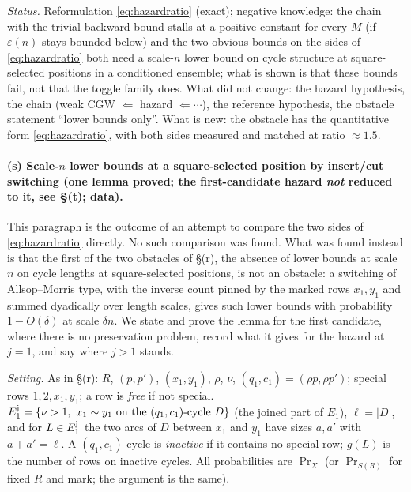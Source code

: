 \emph{Status.}  Reformulation \eqref{eq:hazardratio} (exact);
negative knowledge: the chain with the trivial backward bound stalls
at a positive constant for every $M$ (if $\varepsilon(n)$ stays
bounded below) and the two obvious bounds on the sides of
\eqref{eq:hazardratio} both need a scale-$n$ lower bound on cycle
structure at square-selected positions in a conditioned ensemble;
what is shown is that these bounds fail, not that the toggle family
does.  What did
not change: the hazard hypothesis, the chain (weak CGW $\Leftarrow$
hazard $\Leftarrow\cdots$), the reference hypothesis, the obstacle
statement ``lower bounds only''.  What is new: the obstacle has the
quantitative form \eqref{eq:hazardratio}, with both sides measured
and matched at ratio $\approx1.5$.

\paragraph{(s) Scale-$n$ lower bounds at a square-selected position by
insert/cut switching (one lemma proved; the first-candidate hazard
\emph{not} reduced to it, see \S(t); data).}
This paragraph is the outcome of an attempt to compare the two sides of
\eqref{eq:hazardratio} directly.  No such comparison was found.  What
was found instead is that the first of the two obstacles of \S(r), the
absence of lower bounds at scale $n$ on cycle lengths at
square-selected positions, is not an obstacle: a switching of
Allsop--Morris type, with the inverse count pinned by the marked rows
$x_1,y_1$ and summed dyadically over length scales, gives such lower
bounds with probability $1-O(\delta)$ at scale $\delta n$.  We state
and prove the lemma for the first candidate, where there is no
preservation problem, record what it gives for the hazard at $j=1$,
and say where $j>1$ stands.

\emph{Setting.}  As in \S(r): $R$, $(p,p')$, $(x_1,y_1)$, $\rho$,
$\nu$, $(q_1,c_1)=(\rho p,\rho p')$; special rows $1,2,x_1,y_1$; a row
is \emph{free} if not special.  $E_1^{\rm j}=\{\nu>1,\ x_1\sim y_1
\text{ on the }(q_1,c_1)\text{-cycle }D\}$ (the joined part of $E_1$),
$\ell=|D|$, and for $L\in E_1^{\rm j}$ the two arcs of $D$ between
$x_1$ and $y_1$ have sizes $a,a'$ with $a+a'=\ell$.  A
$(q_1,c_1)$-cycle is \emph{inactive} if it contains no special row;
$g(L)$ is the number of rows on inactive cycles.  All probabilities
are $\Pr_X$ (or $\Pr_{S(R)}$ for fixed $R$ and mark; the argument is
the same).

